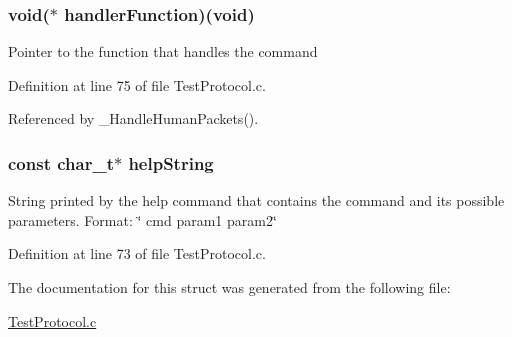 \hypertarget{struct_human_command__t_aada4fa790805e28d3885209a6d22daf2}{
\subsubsection[{handler\-Function}]{\setlength{\rightskip}{0pt plus 5cm}void($\ast$ handler\-Function)(void)}}\label{struct_human_command__t_aada4fa790805e28d3885209a6d22daf2}
Pointer to the function that handles the command 

Definition at line 75 of file Test\-Protocol.\-c.



Referenced by \-\_\-\-Handle\-Human\-Packets().

\hypertarget{struct_human_command__t_a66b03d84bdbad5159adaa74f6bd89c17}{
\subsubsection[{help\-String}]{\setlength{\rightskip}{0pt plus 5cm}const {\bf char\-\_\-t}$\ast$ help\-String}}\label{struct_human_command__t_a66b03d84bdbad5159adaa74f6bd89c17}
String printed by the help command that contains the command and its possible parameters. Format\-: \char`\"{} cmd param1 param2\char`\"{} 

Definition at line 73 of file Test\-Protocol.\-c.



The documentation for this struct was generated from the following file\-:\begin{DoxyCompactItemize}
\item 
\hyperlink{_test_protocol_8c}{Test\-Protocol.\-c}\end{DoxyCompactItemize}
